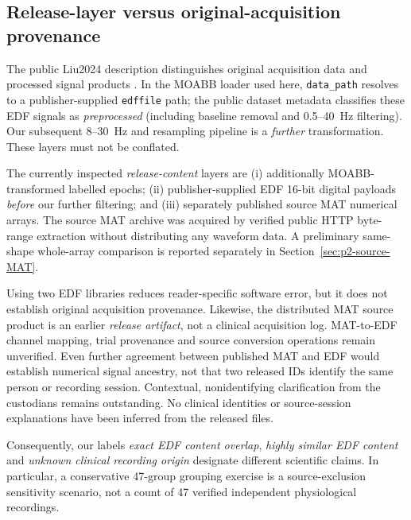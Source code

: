 \subsection{Release-layer versus original-acquisition provenance}
\label{sec:p2-public-provenance-tier}
The public Liu2024 description distinguishes original
acquisition data and processed signal products
\cite{liu2024stroke}. In the MOABB loader used here,
\texttt{data\_path} resolves to a
publisher-supplied \texttt{edffile} path; the
public dataset metadata classifies these EDF
signals as \emph{preprocessed} (including
baseline removal and 0.5--40~Hz filtering).
Our subsequent 8--30~Hz and resampling
pipeline is a \emph{further} transformation.
These layers must not be conflated.

The currently inspected \emph{release-content}
layers are (i) additionally MOABB-transformed
labelled epochs; (ii) publisher-supplied EDF
16-bit digital payloads \emph{before} our
further filtering; and (iii) separately published
source MAT numerical arrays. The source MAT
archive was acquired by verified public HTTP
byte-range extraction without distributing any
waveform data. A preliminary same-shape
whole-array comparison is reported separately
in Section~\ref{sec:p2-source-MAT}.

Using two EDF libraries reduces reader-specific
software error, but it does not establish
original acquisition provenance. Likewise,
the distributed MAT source product is an
earlier \emph{release artifact}, not
a clinical acquisition log. MAT-to-EDF
channel mapping, trial provenance and source
conversion operations remain unverified.
Even further agreement between published
MAT and EDF would establish numerical
signal ancestry, not that two released
IDs identify the same person or recording
session. Contextual, nonidentifying
clarification from the custodians remains
outstanding. No clinical identities or
source-session explanations have been
inferred from the released files.

Consequently, our labels \emph{exact EDF
content overlap}, \emph{highly similar
EDF content} and \emph{unknown clinical
recording origin} designate different
scientific claims. In particular, a
conservative 47-group grouping exercise
is a source-exclusion sensitivity
scenario, not a count of 47 verified
independent physiological recordings.
